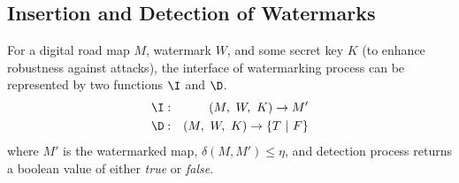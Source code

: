 \subsection{Insertion and Detection of Watermarks}
For a digital road map $M$, watermark $W$, and some secret key $K$ 
(to enhance robustness against attacks), the 
interface of watermarking process can be represented by two functions 
$\I$ and  $\D$.
\begin{eqnarray*}
\I &:& (M,~W,~K) \rightarrow M' \\
\D &:& (M,~W,~K) \rightarrow \{T~|~F\} 
\end{eqnarray*}
\noindent
where $M'$ is the watermarked map, %
$\delta(M, M') \le \eta$, and detection process returns a boolean value
of either {\em true} or {\em false}.




